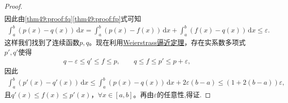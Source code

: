 \documentclass[../../main.tex]{subfiles}%
\begin{document}
\begin{proof}
\begin{align}
\end{align}
因此由\eqref{thm49:proof:fq}\eqref{thm49:proof:fp}式可知
\begin{align*}
\int_{a}^{b} (p(x)-q(x))\,\mathrm{d}x = \int_{a}^{b} (p(x)-f(x))\,\mathrm{d}x + \int_{a}^{b} (f(x)-q(x))\,\mathrm{d}x \leqslant \varepsilon.
\end{align*}
这样我们找到了连续函数$p,q$。现在利用\hyperref[theorem:多项式逼近有限阶光滑函数-Weierstrass逼近定理]{Weierstrass逼近定理}，存在实系数多项式$p',q'$使得
\begin{align*}
q-\varepsilon \leqslant q' \leqslant f\leqslant p,\qquad q\leqslant f\leqslant p' \leqslant p+\varepsilon, 
\end{align*}
因此
\begin{align*}
\int_{a}^{b} (p'(x)-q'(x))\,\mathrm{d}x \leqslant \int_{a}^{b} (p(x)-q(x))\,\mathrm{d}x + 2\varepsilon (b-a) \leqslant (1+2(b-a))\varepsilon, 
\end{align*}
且$q'(x)\leqslant f(x)\leqslant p'(x)$，$\forall x\in[a,b]$。再由$\varepsilon$的任意性,得证.
\end{proof}
\end{document}
